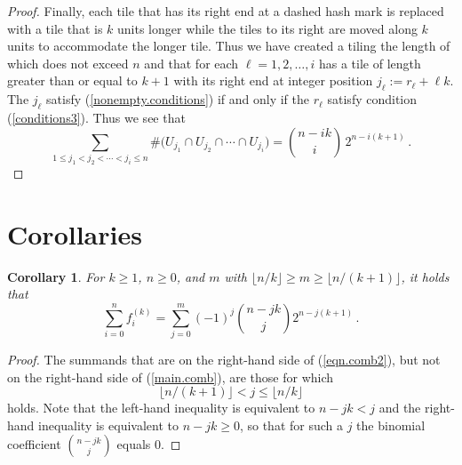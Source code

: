 \documentclass[11pt,reqno]{amsart}
\theoremstyle{plain}
\numberwithin{equation}{section}
\newtheorem{corollary}[thm]{Corollary}
\begin{document}
\begin{proof}
Finally,  each  tile that has its right end at a dashed hash mark is replaced with a tile that is $k$ units longer while the tiles to its right are moved along $k$ units to accommodate the longer tile. 
Thus we have created a tiling the length of which does not exceed $n$ and that for each $\ell = 1,2, \dots, i$ has a tile of  length greater than or equal to $k+1$ with its right end at  integer position $j_\ell := r_\ell + \ell k$. 
The $j_\ell$ satisfy (\ref{nonempty.conditions}) if and only if the $r_\ell$ satisfy condition (\ref{conditions3}).
Thus  we see that  
\[
\sum_{1\leq j_1<j_2<\cdots<j_i\leq n}
\#\Big( U_{j_1}\cap U_{j_2}\cap \cdots \cap U_{j_i} \Big)
=
\binom{n-i k }{ i}\, 2^{n-i(k+1)}\,.
\]
\end{proof}

\section{Corollaries}

\begin{corollary}
For $k\geq 1$, $n\geq 0$,
and  $m$ with ${\lfloor n/k \rfloor}  \geq m \geq {\lfloor n/(k+1) \rfloor}  $, it 
holds that
\begin{equation}
\label{eqn.comb2}
\sum_{i=0}^{n} f_i^{(k)}  %
=\sum_{j=0}^{m} (-1)^{j} \binom{n-jk}{j}2^{n-j(k+1)} 
\,.
\end{equation}
\end{corollary}
\begin{proof}
The summands that are on the right-hand side of
(\ref{eqn.comb2}), but not on the right-hand side of 
(\ref{main.comb}), are those for which
$$
{\lfloor n/(k+1) \rfloor} <  j \leq {\lfloor n/k \rfloor} 
$$
holds. 
Note that the left-hand inequality is 
equivalent to $n-jk < j$ and the right-hand inequality 
is equivalent to $n-jk \geq 0$, so that for such a $j$ the binomial coefficient 
$\binom{n-jk}{j} $ equals $0$. 
\end{proof}
\end{document}
